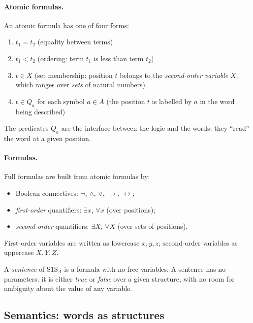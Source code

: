 \paragraph{Atomic formulas.}
An atomic formula has one of four forms:
\begin{enumerate}
  \item $t_1 = t_2$ \quad (equality between terms)
  \item $t_1 < t_2$ \quad (ordering: term $t_1$ is less than term $t_2$)
  \item $t \in X$ \quad (set membership: position $t$ belongs to the
        \emph{second-order variable} $X$, which ranges over \emph{sets} of
        natural numbers)
  \item $t \in Q_a$ \quad for each symbol $a \in A$ (the position $t$ is
        labelled by $a$ in the word being described)
\end{enumerate}

The predicates $Q_a$ are the interface between the logic and the words: they
``read'' the word at a given position.

\paragraph{Formulas.}
Full formulas are built from atomic formulas by:
\begin{itemize}
  \item Boolean connectives: $\neg$, $\land$, $\lor$, $\to$, $\leftrightarrow$;
  \item \emph{first-order} quantifiers: $\exists x$, $\forall x$ (over positions);
  \item \emph{second-order} quantifiers: $\exists X$, $\forall X$ (over
        sets of positions).
\end{itemize}
First-order variables are written as lowercase $x, y, z$; second-order
variables as uppercase $X, Y, Z$.

\begin{definition}[S1S$_A$ sentence]
A \emph{sentence} of S1S$_A$ is a formula with no free variables.  A
sentence has no parameters: it is either \emph{true} or \emph{false}
over a given structure, with no room for ambiguity about the value of
any variable.
\end{definition}

\subsection{Semantics: words as structures}

